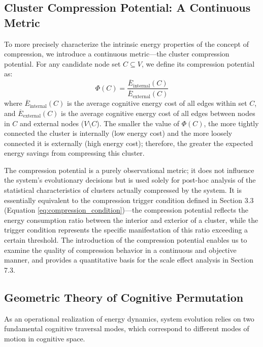 \documentclass[10pt,onecolumn]{article}
\begin{document}
\subsection{Cluster Compression Potential: A Continuous Metric}
\label{subsec:compression_potential}

To more precisely characterize the intrinsic energy properties of the concept of compression, we introduce a continuous metric—the cluster compression potential. For any candidate node set $C \subseteq V$, we define its compression potential as:
\begin{equation}
\Phi(C) = \frac{\overline{E}_{\text{internal}}(C)}{\overline{E}_{\text{external}}(C)}
\label{eq:compression_potential}
\end{equation}
where $\overline{E}_{\text{internal}}(C)$ is the average cognitive energy cost of all edges within set $C$, and $\overline{E}_{\text{external}}(C)$ is the average cognitive energy cost of all edges between nodes in $C$ and external nodes ($V \setminus C$). The smaller the value of $\Phi(C)$, the more tightly connected the cluster is internally (low energy cost) and the more loosely connected it is externally (high energy cost); therefore, the greater the expected energy savings from compressing this cluster.

The compression potential is a purely observational metric; it does not influence the system’s evolutionary decisions but is used solely for post-hoc analysis of the statistical characteristics of clusters actually compressed by the system. It is essentially equivalent to the compression trigger condition defined in Section 3.3 (Equation \ref{eq:compression_condition})—the compression potential reflects the energy consumption ratio between the interior and exterior of a cluster, while the trigger condition represents the specific manifestation of this ratio exceeding a certain threshold. The introduction of the compression potential enables us to examine the quality of compression behavior in a continuous and objective manner, and provides a quantitative basis for the scale effect analysis in Section 7.3.

\subsection{Geometric Theory of Cognitive Permutation}

As an operational realization of energy dynamics, system evolution relies on two fundamental cognitive traversal modes, which correspond to different modes of motion in cognitive space.
\end{document}
